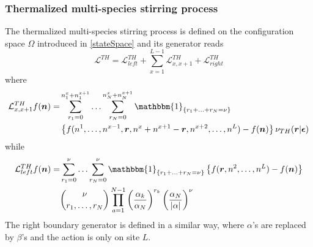 \documentclass[10pt]{article}
\numberwithin{equation}{section}
\numberwithin{equation}{subsection}
\begin{document}
\subsubsection{Thermalized multi-species stirring process}
The thermalized multi-species stirring process is defined on the configuration space $\Omega$ introduced in \eqref{stateSpace} and its generator reads
\begin{equation}\label{thermalizedGenerator}
	\mathcal{L}^{TH}=\mathcal{L}_{left}^{TH}+\sum_{x=1}^{L-1}\mathcal{L}_{x,x+1}^{TH}+\mathcal{L}_{right}^{TH}
\end{equation}
where 
\begin{equation}\label{bulkThermalized}
	\begin{split}
	\mathcal{L}_{x,x+1}^{TH}f(\bm{n})=&\sum_{r_{1}=0}^{n_{1}^{x}+n_{1}^{x+1}}\ldots\sum_{r_{N}=0}^{n_{N}^{x}+n_{N}^{x+1}}\mathbbm{1}_{\{r_{1}+\ldots+r_{N}=\nu\}}
	\\&
	\left\{f(n^{1},\ldots,n^{x-1},\bm{r},n^{x}+n^{x+1}-\bm{r},n^{x+2},\ldots,n^{L})-f(\bm{n})\right\}\nu_{TH}(\bm{r}|\bm{\epsilon})
	\end{split}
\end{equation}
while
\begin{equation}\label{boundaryThermalized}
	\begin{split}
		\mathcal{L}_{left}^{TH}f(\bm{n})=&\sum_{r_{1}=0}^{\nu}\ldots\sum_{r_{N}=0}^{\nu}\mathbbm{1}_{\{r_{1}+\ldots+r_{N}=\nu\}}\left\{f(\bm{r},n^{2},\ldots,n^{L})-f(\bm{n})\right\}\\&
		\binom{\nu}{r_{1},\ldots, r_{N}}\prod_{a=1}^{N-1}\left(\frac{\alpha_{k}}{\alpha_{N}}\right)^{r_{k}}\left(\frac{\alpha_{N}}{|\alpha|}\right)^{\nu}
		\end{split}
	\end{equation}
The right boundary generator is defined in a similar way, where $\alpha$'s are replaced by $\beta$'s and the action is only on site $L$. 
\end{document}
